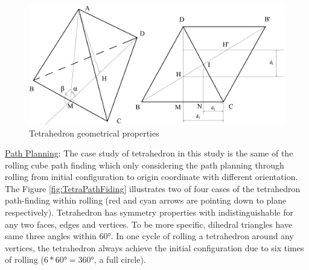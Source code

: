 \begin{figure}[h]
\centering
	\includegraphics[width=\textwidth]{image/TetraGeo11.png}
%	
	\caption{Tetrahedron geometrical properties}
	\label{fig:tetraGeo1}
\end{figure}

\noindent\uline{Path Planning}:
The case study of tetrahedron in this study is the same of the rolling cube path finding which only considering the path planning through rolling from initial configuration to origin coordinate with different orientation. 
The Figure \ref{fig:TetraPathFiding} illustrates two of four cases of the tetrahedron path-finding within rolling (red and cyan arrows are pointing down to plane respectively). Tetrahedron has symmetry properties with indistinguishable for any two faces, edges and vertices. To be more specific, dihedral triangles have same three angles within $\ang{60}$. 
In one cycle of rolling a tetrahedron around any vertices, the tetrahedron always achieve the initial configuration due to six times of rolling ($6*\ang{60}=\ang{360}$, a full circle). \\

